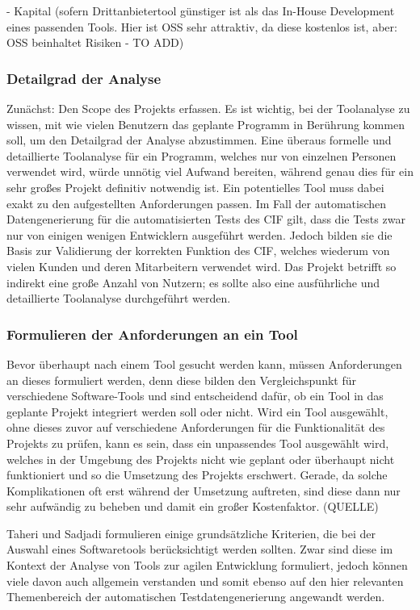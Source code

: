 - Kapital (sofern Drittanbietertool günstiger ist als das In-House Development eines passenden Tools. Hier ist \ac{OSS} sehr attraktiv, da diese kostenlos ist, aber: \ac{OSS} beinhaltet Risiken - TO ADD)

\subsubsection*{Detailgrad der Analyse}\label{toolanalysedetail}
Zunächst: Den Scope des Projekts erfassen. Es ist wichtig, bei der Toolanalyse zu wissen, mit wie vielen Benutzern das geplante Programm in Berührung kommen soll, um den Detailgrad der Analyse abzustimmen. Eine überaus formelle und detaillierte Toolanalyse für ein Programm, welches nur von einzelnen Personen verwendet wird, würde unnötig viel Aufwand bereiten, während genau dies für ein sehr großes Projekt definitiv notwendig ist. Ein potentielles Tool muss dabei exakt zu den aufgestellten Anforderungen passen. \cite[S. 249]{fewster:1999} Im Fall der automatischen Datengenerierung für die automatisierten Tests des \ac{CIF} gilt, dass die Tests zwar nur von einigen wenigen Entwicklern ausgeführt werden. Jedoch bilden sie die Basis zur Validierung der korrekten Funktion des \ac{CIF}, welches wiederum von vielen Kunden und deren Mitarbeitern verwendet wird. Das Projekt betrifft so indirekt eine große Anzahl von Nutzern; es sollte also eine ausführliche und detaillierte Toolanalyse durchgeführt werden.

\subsubsection*{Formulieren der Anforderungen an ein Tool}\label{toolanalyseanforderungen}
Bevor überhaupt nach einem Tool gesucht werden kann, müssen Anforderungen an dieses formuliert werden, denn diese bilden den Vergleichspunkt für verschiedene Software-Tools und sind entscheidend dafür, ob ein Tool in das geplante Projekt integriert werden soll oder nicht. Wird ein Tool ausgewählt, ohne dieses zuvor auf verschiedene Anforderungen für die Funktionalität des Projekts zu prüfen, kann es sein, dass ein unpassendes Tool ausgewählt wird, welches in der Umgebung des Projekts nicht wie geplant oder überhaupt nicht funktioniert und so die Umsetzung des Projekts erschwert. \cite[S. 249]{fewster:1999} Gerade, da solche Komplikationen oft erst während der Umsetzung auftreten, sind diese dann nur sehr aufwändig zu beheben und damit ein großer Kostenfaktor. (QUELLE) 

Taheri und Sadjadi formulieren einige grundsätzliche Kriterien, die bei der Auswahl eines Softwaretools berücksichtigt werden sollten. Zwar sind diese im Kontext der Analyse von Tools zur agilen Entwicklung formuliert, jedoch können viele davon auch allgemein verstanden und somit ebenso auf den hier relevanten Themenbereich der automatischen Testdatengenerierung angewandt werden.

